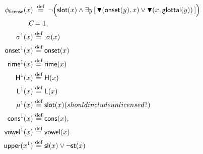 \documentclass[11pt]{article}
\begin{document}
%
%

\begin{align*}
\phi_{\textsf{license}}(x) &
\;\stackrel{\text{def}}{=}\;
\lnot\Big(
\mathsf{slot}(x) \wedge
\exists y \,[\, 
\blacktriangledown(\mathsf{onset}(y),x)
\vee
\blacktriangledown(x,\mathsf{glottal}(y))
\,]
\Big)\\
\textit{C} &= 1, \\
\sigma^1(x) & \stackrel{\text{def}}{=}\;\sigma(x)\\
\textsf{onset}^1 (x) & \stackrel{\text{def}}{=}\textsf{onset} (x) \\
\textsf{rime}^1 (x) & \stackrel{\text{def}}{=}\textsf{rime} (x) \\
\textsf{H}^1 (x) & \stackrel{\text{def}}{=}\textsf{H} (x) \\
\textsf{L}^1 (x) & \stackrel{\text{def}}{=}\textsf{L} (x) \\
\mu^1 (x) & \stackrel{\text{def}}{=}\textsf{slot} (x) (should include unlicensed?)\\
\textsf{cons}^1 (x) & \stackrel{\text{def}}{=} \textsf{cons} (x), \\
\textsf{vowel}^1 (x) & \stackrel{\text{def}}{=} \textsf{vowel} (x) \\
\textsf{upper}(x^1) & \stackrel{\text{def}}{=} \textsf{sl}(x) \vee \lnot \textsf{st}(x) \\
\end{align*}





\end{document}
